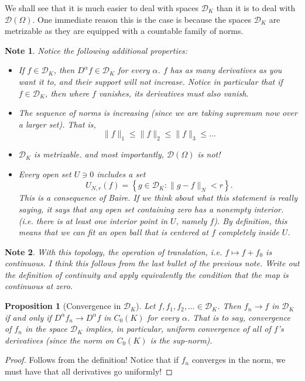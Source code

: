 \documentclass[letterpaper,twoside,11pt]{article}
\theoremstyle{mystyle}
\newtheorem{prop}{Proposition}[section]
\newtheorem*{note}{Note}
\newcommand{\cg}{\color{gray}}
\newcommand{\cbk}{\color{black}}
\newcommand{\cred}{\color{red}}
\begin{document}
We shall see that it is much easier to deal with spaces $\mathcal D_K$ than it is to deal with $\mathcal D(\Omega)$. \cg One immediate reason this is the case is because the spaces $\mathcal D_K$ are metrizable as they are equipped with a countable family of norms. \cbk 
\begin{note}
  Notice the following additional properties: 
\begin{itemize}
  \item If $f\in \mathcal D_K$, then $D^\alpha f \in \mathcal D_K$ for every $\alpha$. \cg $f$ has as many derivatives as you want it to, and their support will not increase. Notice in particular that if $f \in \mathcal D_K$, then where $f$ vanishes, its derivatives must also vanish. \cbk 
  \item The sequence of norms is increasing \cg(since we are taking supremum now over a larger set)\cbk. That is, 
  \[\|f\|_1 \leq \|f\|_2 \leq \|f\|_3\leq \dots \]
  \item $\mathcal D_K$ is metrizable. \cg and most importantly, $\mathcal D(\Omega)$ is not!\cbk 
  \item Every open set $U\ni 0$ includes a set 
  \[U_{N,r}(f) = \left\{ g\in \mathcal D_K : \|g-f\|_N < r\right\}.\]
  \cg This is a consequence of Baire. If we think about what this statement is really saying, it says that any open set containing zero has a nonempty interior. (i.e. there is at least one interior point in $U$, namely $f$). By definition, this means that we can fit an open ball that is centered at $f$ completely inside $U$. \cbk 
\end{itemize}
\end{note}
\begin{note}
  With this topology, the operation of translation, i.e. $f \mapsto f + f_0$ is continuous. \cg I think this follows from the last bullet of the previous note. Write out the definition of continuity and apply equivalently the condition that the map is continuous at zero.\cbk 
\end{note}
\begin{prop}[Convergence in $\mathcal D_K$]
  Let $f, f_1, f_2, \dots \in \mathcal D_K$. Then $f_n \to f$ in $\mathcal D_K$ if and only if $D^\alpha f_n \to D^\alpha f$ in $C_0(K)$ for every $\alpha$. \cg That is to say, convergence of $f_n$ in the space $\mathcal D_K$ implies, in particular, \cred uniform convergence \cg of all of $f$'s derivatives (since the norm on $C_0(K)$ is the sup-norm).\cbk 
\end{prop}
\begin{proof}
  Follows from the definition! \cg Notice that if $f_n$ converges in the norm, we must have that all derivatives go uniformly!\cbk 
\end{proof}
\end{document}
